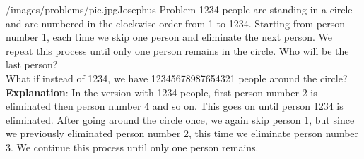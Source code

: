 \begin{problem}{/images/problems/pic.jpg}{Josephus Problem}  1234 people are standing in a circle and are numbered in the clockwise order from 1 to 1234. Starting from person number 1, each time we skip one person and eliminate the next person. We repeat this process until only one person remains in the circle. Who will be the last person?\\[0.2cm]
	
What if instead of 1234, we have 12345678987654321 people around the circle?\\[0.2cm]
	
\textbf{Explanation}: In the version with 1234 people, first person number 2 is eliminated then person number 4 and so on. This goes on until person 1234 is eliminated. After going around the circle once, we again skip person 1, but since we previously eliminated person number 2, this time we eliminate person number 3. We continue this process until only one person remains.
\end{problem}
